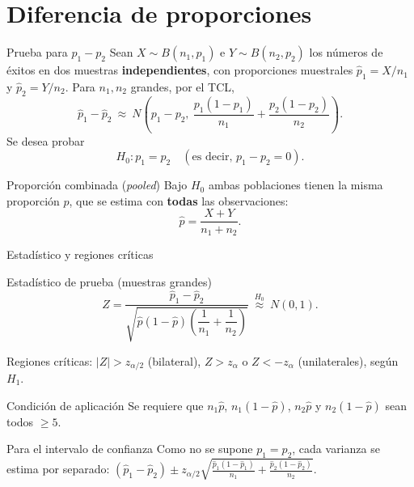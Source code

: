 \documentclass[aspectratio=169,11pt]{beamer}
\begin{document}
\section{Diferencia de proporciones}

\begin{frame}{Prueba para $p_1-p_2$}
Sean $X\sim B(n_1,p_1)$ e $Y\sim B(n_2,p_2)$ los números de éxitos en dos muestras \textbf{independientes}, con proporciones muestrales $\hat p_1=X/n_1$ y $\hat p_2=Y/n_2$. Para $n_1,n_2$ grandes, por el TCL,
\[
\hat p_1-\hat p_2\ \approx\ N\!\left(p_1-p_2,\ \frac{p_1(1-p_1)}{n_1}+\frac{p_2(1-p_2)}{n_2}\right).
\]
Se desea probar
\[
H_0:p_1=p_2 \quad (\text{es decir, } p_1-p_2=0).
\]

\begin{block}{Proporción combinada (\emph{pooled})}
Bajo $H_0$ ambas poblaciones tienen la misma proporción $p$, que se estima con \textbf{todas} las observaciones:
\[
\hat p=\frac{X+Y}{n_1+n_2}.
\]
\end{block}
\end{frame}

\begin{frame}{Estadístico y regiones críticas}
\begin{block}{Estadístico de prueba (muestras grandes)}
\[
Z=\frac{\hat p_1-\hat p_2}{\sqrt{\hat p(1-\hat p)\left(\dfrac{1}{n_1}+\dfrac{1}{n_2}\right)}} \ \overset{H_0}{\approx}\ N(0,1).
\]
\end{block}

Regiones críticas: $|Z|>z_{\alpha/2}$ (bilateral), $Z>z_\alpha$ o $Z<-z_\alpha$ (unilaterales), según $H_1$.

\begin{alertblock}{Condición de aplicación}
Se requiere que $n_1\hat p$, $n_1(1-\hat p)$, $n_2\hat p$ y $n_2(1-\hat p)$ sean todos $\ge5$.
\end{alertblock}

\begin{block}{Para el intervalo de confianza}
Como no se supone $p_1=p_2$, cada varianza se estima por separado:
$\displaystyle (\hat p_1-\hat p_2)\pm z_{\alpha/2}\sqrt{\tfrac{\hat p_1(1-\hat p_1)}{n_1}+\tfrac{\hat p_2(1-\hat p_2)}{n_2}}$.
\end{block}
\end{frame}
\end{document}
